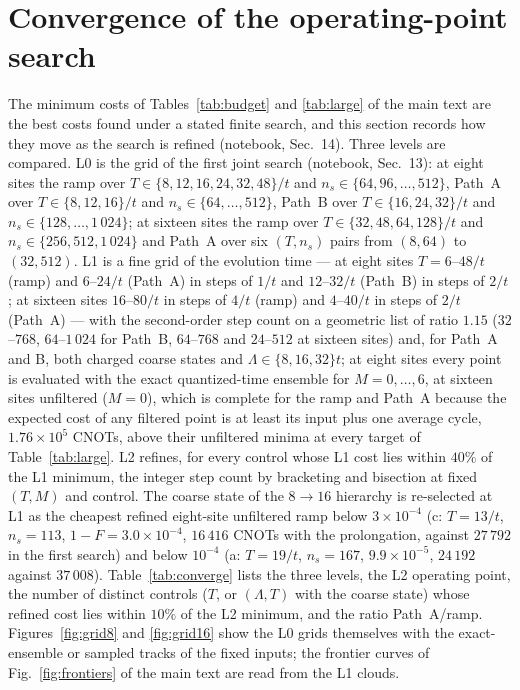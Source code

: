 \documentclass[a4paper,11pt,noarxiv]{quantumarticle}
\begin{document}
\section{Convergence of the operating-point search}
\label{sm:converge}
The minimum costs of Tables~\ref{tab:budget} and \ref{tab:large} of the
main text are the best costs found under a stated finite search, and this
section records how they move as the search is refined (notebook,
Sec.~14).  Three levels are compared.  L0 is the grid of the first joint
search (notebook, Sec.~13): at eight sites the ramp over
$T\in\{8,12,16,24,32,48\}/t$ and $n_s\in\{64,96,\ldots,512\}$, Path~A over
$T\in\{8,12,16\}/t$ and $n_s\in\{64,\ldots,512\}$, Path~B over
$T\in\{16,24,32\}/t$ and $n_s\in\{128,\ldots,1\,024\}$; at sixteen sites
the ramp over $T\in\{32,48,64,128\}/t$ and $n_s\in\{256,512,1\,024\}$ and
Path~A over six $(T,n_s)$ pairs from $(8,64)$ to $(32,512)$.  L1 is a fine
grid of the evolution time --- at eight sites $T=6$--$48/t$ (ramp) and
$6$--$24/t$ (Path~A) in steps of $1/t$ and $12$--$32/t$ (Path~B) in steps
of $2/t$; at sixteen sites $16$--$80/t$ in steps of $4/t$ (ramp) and
$4$--$40/t$ in steps of $2/t$ (Path~A) --- with the second-order step
count on a geometric list of ratio $1.15$ ($32$--$768$, $64$--$1\,024$ for
Path~B, $64$--$768$ and $24$--$512$ at sixteen sites) and, for Path~A and
B, both charged coarse states and $\Lambda\in\{8,16,32\}t$; at eight sites
every point is evaluated with the exact quantized-time ensemble for
$M=0,\ldots,6$, at sixteen sites unfiltered ($M=0$), which is complete for
the ramp and Path~A because the expected cost of any filtered point is
at least its input plus one average cycle, $1.76\times10^5$ CNOTs, above
their unfiltered minima at every target of Table~\ref{tab:large}.  L2
refines, for every control whose L1 cost lies within $40\%$ of the L1
minimum, the integer step count by bracketing and bisection at fixed
$(T,M)$ and control.  The coarse state of the $8\to16$ hierarchy is
re-selected at L1 as the cheapest refined eight-site unfiltered ramp
below $3\times10^{-4}$ (c: $T=13/t$, $n_s=113$, $1-F=3.0\times10^{-4}$,
$16\,416$ CNOTs with the prolongation, against $27\,792$ in the first
search) and below $10^{-4}$ (a: $T=19/t$, $n_s=167$, $9.9\times10^{-5}$,
$24\,192$ against $37\,008$).  Table~\ref{tab:converge} lists the three
levels, the L2 operating point, the number of distinct controls ($T$, or
$(\Lambda,T)$ with the coarse state) whose refined cost lies within $10\%$
of the L2 minimum, and the ratio Path~A/ramp.  Figures~\ref{fig:grid8} and
\ref{fig:grid16} show the L0 grids themselves with the exact-ensemble or
sampled tracks of the fixed inputs; the frontier curves of
Fig.~\ref{fig:frontiers} of the main text are read from the L1 clouds.
\end{document}
